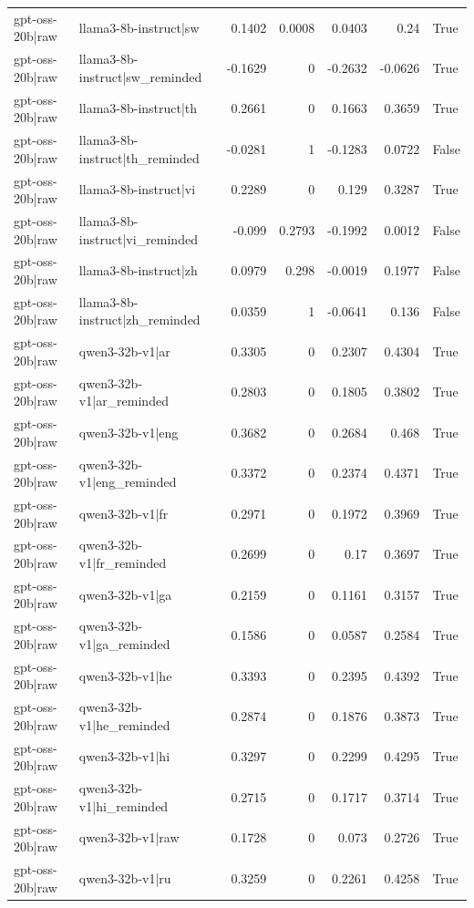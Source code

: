 \begin{table}
\begin{tabular}{l l r r r r l}
gpt-oss-20b|raw & llama3-8b-instruct|sw & 0.1402 & 0.0008 & 0.0403 & 0.24 & True \\
gpt-oss-20b|raw & llama3-8b-instruct|sw_reminded & -0.1629 & 0 & -0.2632 & -0.0626 & True \\
gpt-oss-20b|raw & llama3-8b-instruct|th & 0.2661 & 0 & 0.1663 & 0.3659 & True \\
gpt-oss-20b|raw & llama3-8b-instruct|th_reminded & -0.0281 & 1 & -0.1283 & 0.0722 & False \\
gpt-oss-20b|raw & llama3-8b-instruct|vi & 0.2289 & 0 & 0.129 & 0.3287 & True \\
gpt-oss-20b|raw & llama3-8b-instruct|vi_reminded & -0.099 & 0.2793 & -0.1992 & 0.0012 & False \\
gpt-oss-20b|raw & llama3-8b-instruct|zh & 0.0979 & 0.298 & -0.0019 & 0.1977 & False \\
gpt-oss-20b|raw & llama3-8b-instruct|zh_reminded & 0.0359 & 1 & -0.0641 & 0.136 & False \\
gpt-oss-20b|raw & qwen3-32b-v1|ar & 0.3305 & 0 & 0.2307 & 0.4304 & True \\
gpt-oss-20b|raw & qwen3-32b-v1|ar_reminded & 0.2803 & 0 & 0.1805 & 0.3802 & True \\
gpt-oss-20b|raw & qwen3-32b-v1|eng & 0.3682 & 0 & 0.2684 & 0.468 & True \\
gpt-oss-20b|raw & qwen3-32b-v1|eng_reminded & 0.3372 & 0 & 0.2374 & 0.4371 & True \\
gpt-oss-20b|raw & qwen3-32b-v1|fr & 0.2971 & 0 & 0.1972 & 0.3969 & True \\
gpt-oss-20b|raw & qwen3-32b-v1|fr_reminded & 0.2699 & 0 & 0.17 & 0.3697 & True \\
gpt-oss-20b|raw & qwen3-32b-v1|ga & 0.2159 & 0 & 0.1161 & 0.3157 & True \\
gpt-oss-20b|raw & qwen3-32b-v1|ga_reminded & 0.1586 & 0 & 0.0587 & 0.2584 & True \\
gpt-oss-20b|raw & qwen3-32b-v1|he & 0.3393 & 0 & 0.2395 & 0.4392 & True \\
gpt-oss-20b|raw & qwen3-32b-v1|he_reminded & 0.2874 & 0 & 0.1876 & 0.3873 & True \\
gpt-oss-20b|raw & qwen3-32b-v1|hi & 0.3297 & 0 & 0.2299 & 0.4295 & True \\
gpt-oss-20b|raw & qwen3-32b-v1|hi_reminded & 0.2715 & 0 & 0.1717 & 0.3714 & True \\
gpt-oss-20b|raw & qwen3-32b-v1|raw & 0.1728 & 0 & 0.073 & 0.2726 & True \\
gpt-oss-20b|raw & qwen3-32b-v1|ru & 0.3259 & 0 & 0.2261 & 0.4258 & True \\

\end{tabular}
\end{table}
